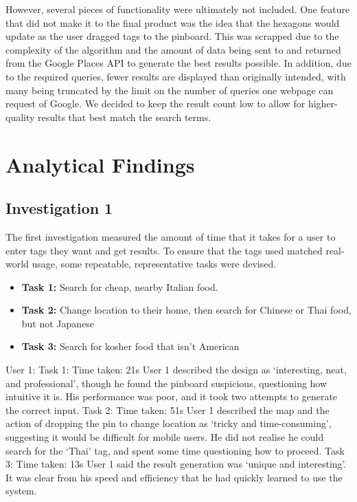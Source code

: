 \documentclass[10pt,a4paper]{article}
\begin{document}
However, several pieces of functionality were ultimately not included. One feature that did not make it to the final product was the idea that the hexagons would update as the user dragged tags to the pinboard. This was scrapped due to the complexity of the algorithm and the amount of data being sent to and returned from the Google Places API to generate the best results possible. In addition, due to the required queries, fewer results are displayed than originally intended, with many being truncated by the limit on the number of queries one webpage can request of Google. We decided to keep the result count low to allow for higher-quality results that best match the search terms.

\section*{Analytical Findings}
\subsection*{Investigation 1}

The first investigation measured the amount of time that it takes for a user to enter tags they want and get results. To ensure that the tags used matched real-world usage, some repeatable, representative tasks were devised.

\begin{itemize}
	\item \textbf{Task 1:} Search for cheap, nearby Italian food.
	\item \textbf{Task 2:} Change location to their home, then search for Chinese or Thai food, but not Japanese
	\item \textbf{Task 3:} Search for kosher food that isn’t American
\end{itemize}

User 1:
Task 1: 
Time taken: 21s
User 1 described the design as ‘interesting, neat, and professional’, though he found the pinboard suspicious, questioning how intuitive it is.
His performance was poor, and it took two attempts to generate the correct input.
Task 2:
Time taken: 51s
User 1 described the map and the action of dropping the pin to change location as ‘tricky and time-consuming’, suggesting it would be difficult for mobile users. 
He did not realise he could search for the ‘Thai’ tag, and spent some time questioning how to proceed.
Task 3:
Time taken: 13s
User 1 said the result generation was ‘unique and interesting’. It was clear from his speed and efficiency that he had quickly learned to use the system.
\end{document}
